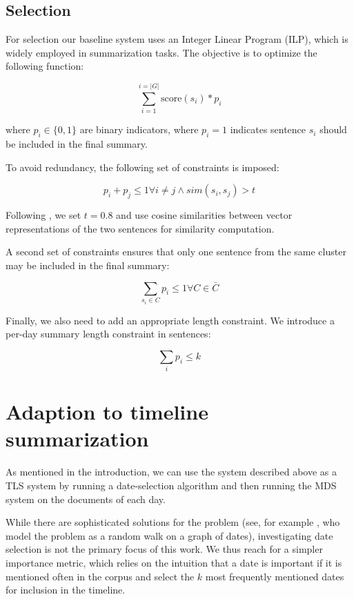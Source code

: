 \documentclass[a4paper,BCOR=10mm]{report}
\begin{document}
\subsection{Selection} \label{sec:baseline-selection}

For selection our baseline system uses an Integer Linear Program (ILP), which is widely employed in summarization tasks.
The objective is to optimize the following function:

\begin{displaymath}
\sum_{i = 1}^{i = |G|} \text{score}(s_i) * p_i
\end{displaymath}

where $p_i \in \{0, 1\}$ are binary indicators, where $p_i = 1$ indicates sentence $s_i$ should be included in the final summary.

To avoid redundancy, the following set of constraints is imposed:

\begin{displaymath}
p_i + p_{j} \leq 1 \forall i \neq j \land sim(s_i, s_j) > t
\end{displaymath}

Following \citet{banerjee}, we set $t = 0.8$ and use cosine similarities between vector representations of the two sentences for similarity computation.

A second set of constraints ensures that only one sentence from the same cluster may be included in the final summary:

\begin{displaymath}
\sum_{s_i \in C} p_i \leq 1 \forall C \in \bar{C}
\end{displaymath}

Finally, we also need to add an appropriate length constraint. We introduce a per-day summary length constraint in sentences:

\begin{displaymath}
\sum_{i} p_i \leq k
\end{displaymath}


\section{Adaption to timeline summarization}

As mentioned in the introduction, we can use the system described above as a TLS system by running a date-selection algorithm and then running the MDS system on the documents of each day.

While there are sophisticated solutions for the problem (see, for example \citet{tran-datesel}, who model the problem as a random walk on a graph of dates), investigating date selection is not the primary focus of this work.
We thus reach for a simpler importance metric, which relies on the intuition that a date is important if it is mentioned often in the corpus and select the $k$ most frequently mentioned dates for inclusion in the timeline.
\end{document}
